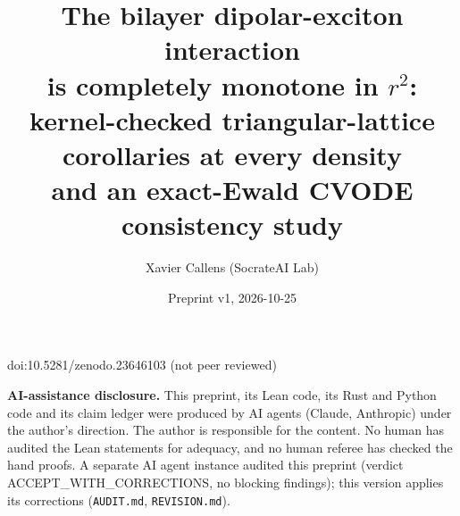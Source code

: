 \documentclass[11pt]{article}
\title{The bilayer dipolar-exciton interaction\\ is completely monotone in $r^2$:\\ kernel-checked triangular-lattice
corollaries at every density\\ and an exact-Ewald CVODE consistency study}
\author{Xavier Callens (SocrateAI Lab)}
\date{Preprint v1, 2026-10-25}
\theoremstyle{remark}
\begin{document}
\maketitle
\begin{center}\small doi:10.5281/zenodo.23646103 \quad (not peer reviewed)\end{center}


\noindent\textbf{AI-assistance disclosure.} This preprint, its Lean code, its Rust and Python code and its claim ledger
were produced by AI agents (Claude, Anthropic) under the author's direction. The author is responsible for the content.
No human has audited the Lean statements for adequacy, and no human referee has checked the hand proofs. A separate AI
agent instance audited this preprint (verdict ACCEPT\_WITH\_CORRECTIONS, no blocking findings); this version applies
its corrections (\texttt{AUDIT.md}, \texttt{REVISION.md}).
\end{document}

